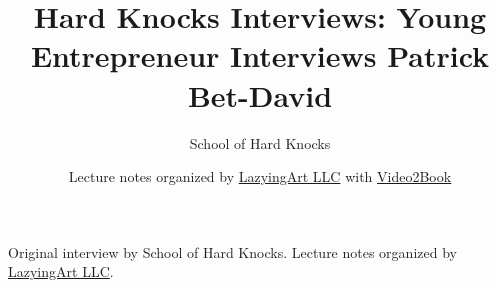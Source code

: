 \documentclass[11pt,oneside]{book}
\begin{document}
\frontmatter
\title{Hard Knocks Interviews: Young Entrepreneur Interviews Patrick Bet-David}
\author{School of Hard Knocks}
\date{Lecture notes organized by \href{https://lazying.art}{LazyingArt LLC} with \href{https://github.com/lachlanchen/Video2Book}{Video2Book}}
\maketitle
\begin{center}
\small Original interview by School of Hard Knocks. Lecture notes organized by \href{https://lazying.art}{LazyingArt LLC}.
\end{center}
\clearpage
\mainmatter

\end{document}
